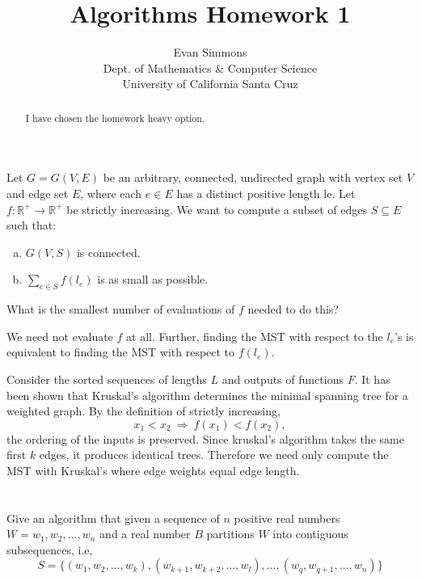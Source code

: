 \documentclass{amsart}
\theoremstyle{definition}
\theoremstyle{remark}
\numberwithin{equation}{section}
\newcommand{\RR}{\mathbb R}
\begin{document}
\title[]{Algorithms Homework 1}%
\author{Evan Simmons \\
        Dept. of Mathematics \& Computer Science \\ University of California Santa Cruz}%
\renewcommand{\abstractname}{Homework Option}
\begin{abstract}
I have chosen the homework heavy option.
\end{abstract}
\maketitle

\section{} Let $G = G(V, E)$ be an arbitrary, connected, undirected graph with
vertex set $V$ and edge set $E$, where each $e \in E$ has a distinct
positive length le. Let $f : \RR^+ \rightarrow \RR^+$ be strictly
increasing. We want to compute a subset of edges $S \subseteq E$ such
that:

\begin{enumerate}[(a)]
  \item $G(V,S)$ is connected.
  \item $\sum_{e \in S} f(l_e)$ is as small as possible.
\end{enumerate}

What is the smallest number of evaluations of $f$ needed to do this?

\claimstar We need not evaluate $f$ at all. Further, finding the MST
with respect to the $l_e$'s is equivalent to finding the MST with
respect to $f(l_e)$.

\proof Consider the sorted sequences of lengths $L$ and outputs of
functions $F$. It has been shown that Kruskal's algorithm determines
the minimal spanning tree for a weighted graph. By the definition of
strictly increasing,
$$ x_1 < x_2\ \Rightarrow\ f(x_1) < f(x_2), $$
the ordering of the inputs is preserved. Since kruskal's algorithm
takes the same first $k$ edges, it produces identical trees. Therefore
we need only compute the MST with Kruskal's where edge weights equal edge
length.

\section{} Give an algorithm that given a sequence of $n$ positive real numbers $W = w_1, w_2,
\ldots, w_n$ and a real number $B$ partitions $W$ into contiguous subsequences, i.e,
$$ S = \{ (w_1,w_2,\ldots,w_k), (w_{k+1},w_{k+2},\ldots,w_l),\ldots,(w_q,w_{q+1},\ldots,w_n) \} $$
\end{document}
